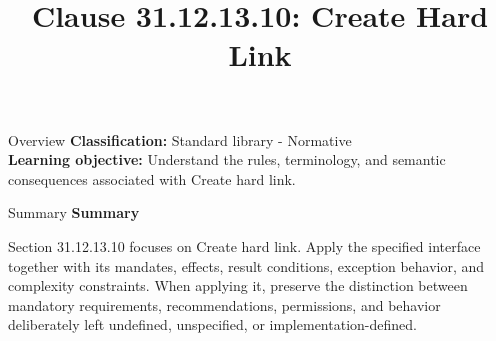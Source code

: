 \documentclass[10pt,letterpaper]{article}
\title{Clause 31.12.13.10: Create Hard Link}
\author{}
\date{}
\begin{document}
\maketitle
\begin{CornellOverviewBox}{Overview}
\textbf{Classification:} Standard library - Normative\\[2pt]
\textbf{Learning objective:} Understand the rules, terminology, and semantic consequences associated with Create hard link.
\end{CornellOverviewBox}\begin{CornellSummaryBox}{Summary}
{\sffamily\bfseries\color{Accent} Summary}\par\vspace{3pt}Section 31.12.13.10 focuses on Create hard link. Apply the specified interface together with its mandates, effects, result conditions, exception behavior, and complexity constraints. When applying it, preserve the distinction between mandatory requirements, recommendations, permissions, and behavior deliberately left undefined, unspecified, or implementation-defined.
\end{CornellSummaryBox}
\end{document}
